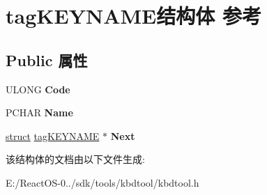 \hypertarget{structtag_k_e_y_n_a_m_e}{}\section{tag\+K\+E\+Y\+N\+A\+M\+E结构体 参考}
\label{structtag_k_e_y_n_a_m_e}
\subsection*{Public 属性}
\begin{DoxyCompactItemize}
\item 
\mbox{\label{structtag_k_e_y_n_a_m_e_ae1204fd850f3594c38313765d3ac33e0}} 
U\+L\+O\+NG {\bfseries Code}
\item 
\mbox{\label{structtag_k_e_y_n_a_m_e_aaf41ec85f12778a3025f0e5f806ba8bf}} 
P\+C\+H\+AR {\bfseries Name}
\item 
\mbox{\label{structtag_k_e_y_n_a_m_e_ae655584b679c039bd15db579b5c8260e}} 
\hyperlink{interfacestruct}{struct} \hyperlink{structtag_k_e_y_n_a_m_e}{tag\+K\+E\+Y\+N\+A\+ME} $\ast$ {\bfseries Next}
\end{DoxyCompactItemize}


该结构体的文档由以下文件生成\+:\begin{DoxyCompactItemize}
\item 
E\+:/\+React\+O\+S-\/0../sdk/tools/kbdtool/kbdtool.\+h\end{DoxyCompactItemize}
